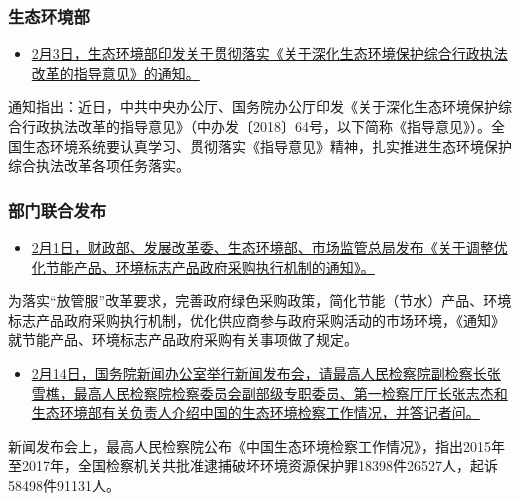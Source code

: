 \documentclass[
]{book}
\providecommand{\tightlist}{%
  \setlength{\itemsep}{0pt}\setlength{\parskip}{0pt}}
\begin{document}
\hypertarget{ux751fux6001ux73afux5883ux90e8-1}{%
\subsubsection*{生态环境部}\label{ux751fux6001ux73afux5883ux90e8-1}}

\begin{itemize}
\tightlist
\item
  \href{http://www.mee.gov.cn/xxgk2018/xxgk/xxgk06/201902/t20190219_692776.html}{2月3日，生态环境部印发关于贯彻落实《关于深化生态环境保护综合行政执法改革的指导意见》的通知。}
\end{itemize}

通知指出：近日，中共中央办公厅、国务院办公厅印发《关于深化生态环境保护综合行政执法改革的指导意见》（中办发〔2018〕64号，以下简称《指导意见》）。全国生态环境系统要认真学习、贯彻落实《指导意见》精神，扎实推进生态环境保护综合执法改革各项任务落实。

\hypertarget{ux90e8ux95e8ux8054ux5408ux53d1ux5e03-3}{%
\subsubsection*{部门联合发布}\label{ux90e8ux95e8ux8054ux5408ux53d1ux5e03-3}}

\begin{itemize}
\tightlist
\item
  \href{http://www.mof.gov.cn/mofhome/guokusi/zhengfuxinxi/guizhangzhidu/201902/t20190212_3146226.html}{2月1日，财政部、发展改革委、生态环境部、市场监管总局发布《关于调整优化节能产品、环境标志产品政府采购执行机制的通知》。}
\end{itemize}

为落实``放管服''改革要求，完善政府绿色采购政策，简化节能（节水）产品、环境标志产品政府采购执行机制，优化供应商参与政府采购活动的市场环境，《通知》就节能产品、环境标志产品政府采购有关事项做了规定。

\begin{itemize}
\tightlist
\item
  \href{http://www.gov.cn/xinwen/2019-02/14/content_5365693.htm\#1}{2月14日，国务院新闻办公室举行新闻发布会，请最高人民检察院副检察长张雪樵，最高人民检察院检察委员会副部级专职委员、第一检察厅厅长张志杰和生态环境部有关负责人介绍中国的生态环境检察工作情况，并答记者问。}
\end{itemize}

新闻发布会上，最高人民检察院公布《中国生态环境检察工作情况》，指出2015年至2017年，全国检察机关共批准逮捕破坏环境资源保护罪18398件26527人，起诉58498件91131人。
\end{document}
